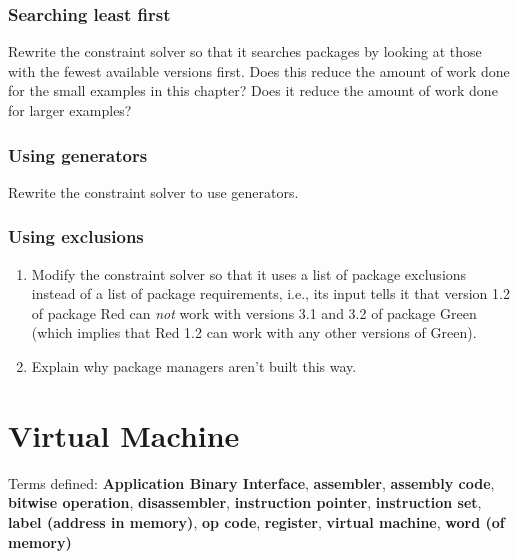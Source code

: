 \documentclass[krantzl]{krantz}
\newcommand{\glossref}[1]{\textbf{#1}}
\begin{document}
\subsection*{Searching least first}


Rewrite the constraint solver so that it searches packages
by looking at those with the fewest available versions first.
Does this reduce the amount of work done for the small examples in this chapter?
Does it reduce the amount of work done for larger examples?

\subsection*{Using generators}


Rewrite the constraint solver to use generators.

\subsection*{Using exclusions}

\begin{enumerate}

\item 

Modify the constraint solver so that
    it uses a list of package exclusions instead of a list of package requirements,
    i.e.,
    its input tells it that version 1.2 of package Red
    can \emph{not} work with versions 3.1 and 3.2 of package Green
    (which implies that Red 1.2 can work with any other versions of Green).



\item 

Explain why package managers aren’t built this way.



\end{enumerate}

\chapter{Virtual Machine}\label{virtual-machine}


\noindent 
  Terms defined: \glossref{Application Binary Interface}, \glossref{assembler}, \glossref{assembly code}, \glossref{bitwise operation}, \glossref{disassembler}, \glossref{instruction pointer}, \glossref{instruction set}, \glossref{label (address in memory)}, \glossref{op code}, \glossref{register}, \glossref{virtual machine}, \glossref{word (of memory)}
\end{document}
